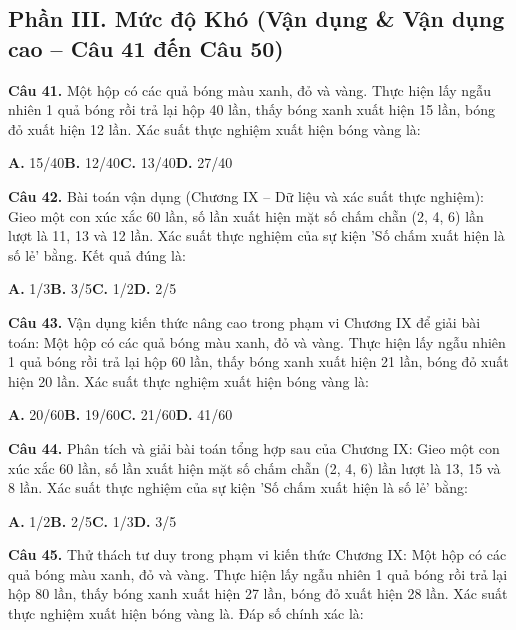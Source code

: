 \documentclass[11pt,a4paper]{article}
\begin{document}
\subsection*{\color{accent} Phần III. Mức độ Khó (Vận dụng \& Vận dụng cao -- Câu 41 đến Câu 50)}
\textbf{\color{primary} Câu 41.} Một hộp có các quả bóng màu xanh, đỏ và vàng. Thực hiện lấy ngẫu nhiên 1 quả bóng rồi trả lại hộp 40 lần, thấy bóng xanh xuất hiện 15 lần, bóng đỏ xuất hiện 12 lần. Xác suất thực nghiệm xuất hiện bóng vàng là:\par
\hspace*{1.5em}\textbf{A.} 15/40\quad\quad \textbf{B.} 12/40\quad\quad \textbf{C.} 13/40\quad\quad \textbf{D.} 27/40\par\vspace{2pt}
\textbf{\color{primary} Câu 42.} Bài toán vận dụng (Chương IX – Dữ liệu và xác suất thực nghiệm): Gieo một con xúc xắc 60 lần, số lần xuất hiện mặt số chấm chẵn (2, 4, 6) lần lượt là 11, 13 và 12 lần. Xác suất thực nghiệm của sự kiện 'Số chấm xuất hiện là số lẻ' bằng. Kết quả đúng là:\par
\hspace*{1.5em}\textbf{A.} 1/3\quad\quad \textbf{B.} 3/5\quad\quad \textbf{C.} 1/2\quad\quad \textbf{D.} 2/5\par\vspace{2pt}
\textbf{\color{primary} Câu 43.} Vận dụng kiến thức nâng cao trong phạm vi Chương IX để giải bài toán: Một hộp có các quả bóng màu xanh, đỏ và vàng. Thực hiện lấy ngẫu nhiên 1 quả bóng rồi trả lại hộp 60 lần, thấy bóng xanh xuất hiện 21 lần, bóng đỏ xuất hiện 20 lần. Xác suất thực nghiệm xuất hiện bóng vàng là:\par
\hspace*{1.5em}\textbf{A.} 20/60\quad\quad \textbf{B.} 19/60\quad\quad \textbf{C.} 21/60\quad\quad \textbf{D.} 41/60\par\vspace{2pt}
\textbf{\color{primary} Câu 44.} Phân tích và giải bài toán tổng hợp sau của Chương IX: Gieo một con xúc xắc 60 lần, số lần xuất hiện mặt số chấm chẵn (2, 4, 6) lần lượt là 13, 15 và 8 lần. Xác suất thực nghiệm của sự kiện 'Số chấm xuất hiện là số lẻ' bằng:\par
\hspace*{1.5em}\textbf{A.} 1/2\quad\quad \textbf{B.} 2/5\quad\quad \textbf{C.} 1/3\quad\quad \textbf{D.} 3/5\par\vspace{2pt}
\textbf{\color{primary} Câu 45.} Thử thách tư duy trong phạm vi kiến thức Chương IX: Một hộp có các quả bóng màu xanh, đỏ và vàng. Thực hiện lấy ngẫu nhiên 1 quả bóng rồi trả lại hộp 80 lần, thấy bóng xanh xuất hiện 27 lần, bóng đỏ xuất hiện 28 lần. Xác suất thực nghiệm xuất hiện bóng vàng là. Đáp số chính xác là:\par
\end{document}
